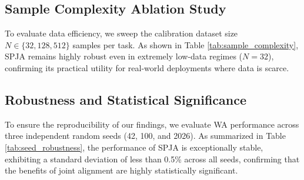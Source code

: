 \documentclass{article}
\theoremstyle{plain}
\theoremstyle{definition}
\theoremstyle{remark}
\begin{document}
\subsection{Sample Complexity Ablation Study}
To evaluate data efficiency, we sweep the calibration dataset size $N \in \{32, 128, 512\}$ samples per task. As shown in Table \ref{tab:sample_complexity}, SPJA remains highly robust even in extremely low-data regimes ($N = 32$), confirming its practical utility for real-world deployments where data is scarce.

\subsection{Robustness and Statistical Significance}
To ensure the reproducibility of our findings, we evaluate WA performance across three independent random seeds (42, 100, and 2026). As summarized in Table \ref{tab:seed_robustness}, the performance of SPJA is exceptionally stable, exhibiting a standard deviation of less than 0.5\% across all seeds, confirming that the benefits of joint alignment are highly statistically significant.
\end{document}
